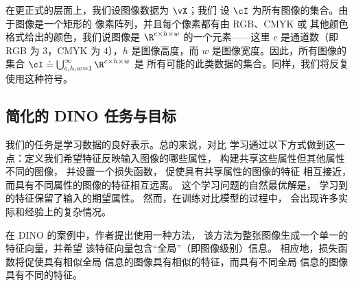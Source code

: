 \documentclass[../../book-main_zh.tex]{subfiles}
\begin{document}
在更正式的层面上，我们设图像数据为 \(\vX\)；我们
设 \(\cI\) 为所有图像的集合。由于图像是一个矩形的
像素阵列，并且每个像素都有由 RGB、CMYK 或
其他颜色格式给出的颜色，我们说图像是 \(\R^{c
\times h \times w}\) 的一个元素——这里 \(c\) 是通道数（即
RGB 为 \(3\)，CMYK 为 \(4\)），\(h\) 是图像高度，而
\(w\) 是图像宽度。因此，所有图像的集合 \(\cI
\doteq \bigcup_{c, h, w = 1}^{\infty}\R^{c \times h \times w}\) 是
所有可能的此类数据的集合。同样，我们将反复使用这种符号。

\subsection{简化的 DINO 任务与目标}
\label{sub:contrastive_learning_objective}

我们的任务是学习数据的良好表示。总的来说，对比
学习通过以下方式做到这一点：定义我们希望特征反映输入图像的哪些属性，
构建共享这些属性但其他属性不同的图像，
并设置一个损失函数，
促使具有共享属性的图像的特征
相互接近，而具有不同属性的图像的特征相互远离。
这个学习问题的自然最优解是，
学习到的特征保留了输入的期望属性。
然而，在训练对比模型的过程中，
会出现许多实际和经验上的复杂情况。

在 DINO 的案例中，作者提出使用一种方法，
该方法为整张图像生成一个单一的特征向量，并希望
该特征向量包含“全局”（即图像级别）信息。
相应地，损失函数将促使具有相似全局
信息的图像具有相似的特征，而具有不同全局
信息的图像具有不同的特征。
\end{document}

